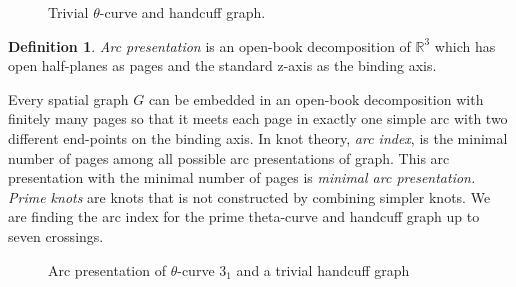 \documentclass{article}
\theoremstyle{definition}
\newtheorem{defn}[thm]{Definition}
\theoremstyle{theorem}
\theoremstyle{proposition}
\theoremstyle{corollary}
\begin{document}
\begin{figure}[h]
    \centering
    \caption{Trivial $\theta$-curve and handcuff graph.}
    \label{figure_1} 
\end{figure}

\begin{defn}
    \textit{Arc presentation} is an open-book decomposition of $\mathbb{R}^3$ which has open half-planes as pages and the standard z-axis as the binding axis.
\end{defn}

Every spatial graph $G$ can be embedded in an open-book decomposition with finitely many pages so that it meets each page in exactly one simple arc with two different end-points on the binding axis.
In knot theory, \textit{arc index}, is the minimal number of pages among all possible arc presentations of graph. This arc presentation with the minimal number of pages is \textit{minimal arc presentation.} \textit{Prime knots} are knots that is not constructed by combining simpler knots. We are finding the arc index for the prime theta-curve and handcuff graph up to seven crossings.

\begin{figure}[h]
    \centering
    \caption{Arc presentation of $\theta$-curve $3_1$ and a trivial handcuff graph}
    \label{figure_1} 
\end{figure}
\end{document}
